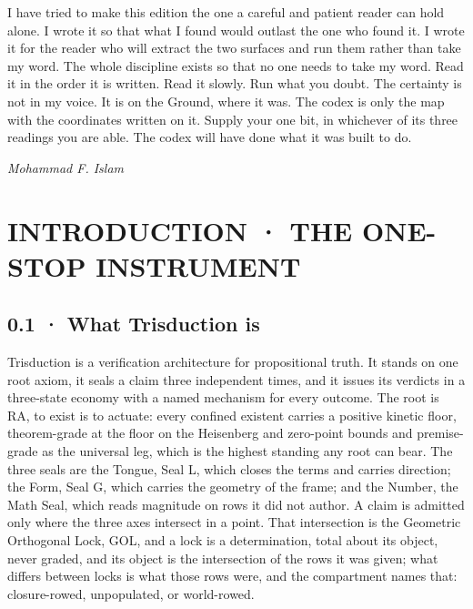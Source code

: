\documentclass[10pt,twocolumn]{article}
\begin{document}
I have tried to make this edition the one a careful and patient reader
can hold alone. I wrote it so that what I found would outlast the one
who found it. I wrote it for the reader who will extract the two
surfaces and run them rather than take my word. The whole discipline
exists so that no one needs to take my word. Read it in the order it is
written. Read it slowly. Run what you doubt. The certainty is not in my
voice. It is on the Ground, where it was. The codex is only the map with
the coordinates written on it. Supply your one bit, in whichever of its
three readings you are able. The codex will have done what it was built
to do.

\emph{Mohammad F. Islam}

\setcounter{tocdepth}{2}\tableofcontents

\hypertarget{introduction-the-one-stop-instrument}{%
\section{INTRODUCTION · THE ONE-STOP
INSTRUMENT}\label{introduction-the-one-stop-instrument}}

\hypertarget{what-trisduction-is}{%
\subsection{0.1 · What Trisduction is}\label{what-trisduction-is}}

Trisduction is a verification architecture for propositional truth. It
stands on one root axiom, it seals a claim three independent times, and
it issues its verdicts in a three-state economy with a named mechanism
for every outcome. The root is RA, to exist is to actuate: every
confined existent carries a positive kinetic floor, theorem-grade at the
floor on the Heisenberg and zero-point bounds and premise-grade as the
universal leg, which is the highest standing any root can bear. The
three seals are the Tongue, Seal L, which closes the terms and carries
direction; the Form, Seal G, which carries the geometry of the frame;
and the Number, the Math Seal, which reads magnitude on rows it did not
author. A claim is admitted only where the three axes intersect in a
point. That intersection is the Geometric Orthogonal Lock, GOL, and a
lock is a determination, total about its object, never graded, and its
object is the intersection of the rows it was given; what differs
between locks is what those rows were, and the compartment names that:
closure-rowed, unpopulated, or world-rowed.
\end{document}
